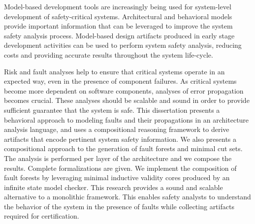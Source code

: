 Model-based development tools are increasingly being used for system-level development of safety-critical systems. Architectural and behavioral models  provide important information that can be leveraged to improve the system safety analysis process. Model-based design artifacts produced in early stage development activities can be used to perform system safety analysis, reducing costs and providing accurate results throughout the system life-cycle.


Risk and fault analyses help to ensure that critical systems operate in an expected way, even in the presence of component failures. As critical systems become more dependent on software components, analyses of error propagation becomes crucial. These analyses should be scalable and sound in order to provide sufficient guarantee that the system is safe. This dissertation presents a behavioral approach to modeling faults and their propagations in an architecture analysis language, and uses a compositional reasoning framework to derive artifacts that encode pertinent system safety information. We also presents a compositional approach to the generation of fault forests and minimal cut sets.  The analysis is performed per layer of the architecture and we compose the results. Complete formalizations are given. We implement the composition of fault forests by leveraging minimal inductive validity cores produced by an infinite state model checker. This research provides a sound and scalable alternative to a monolithic framework. This enables safety analysts to understand the behavior of the system in the presence of faults while collecting artifacts required for certification.





